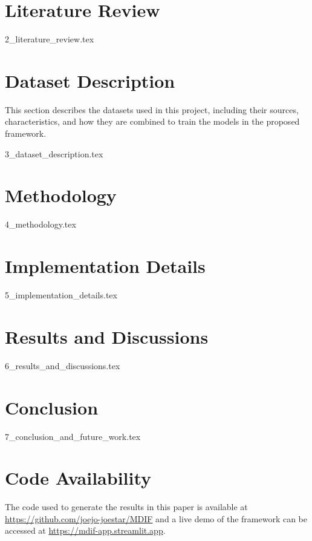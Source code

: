 \documentclass[journal,a4paper]{IEEEtran}
\begin{document}
\section{Literature Review} \label{section:related_works}

{2_literature_review.tex}

\section{Dataset Description} \label{section:datasets}

This section describes the datasets used in this project, including
their sources, characteristics, and how they are combined to train
the models in the proposed framework.

{3_dataset_description.tex}

\section{Methodology} \label{section:methodology}

{4_methodology.tex}

\section{Implementation Details} \label{section:implementation}

{5_implementation_details.tex}

\section{Results and Discussions} \label{section:results}

{6_results_and_discussions.tex}

\section{Conclusion} \label{section:conclusion}

{7_conclusion_and_future_work.tex}


\section{Code Availability} \label{section:code_availability}

The code used to generate the results in this paper is available at
\url{https://github.com/joejo-joestar/MDIF} and a live demo of the framework can
be accessed at \url{https://mdif-app.streamlit.app}.



\end{document}
